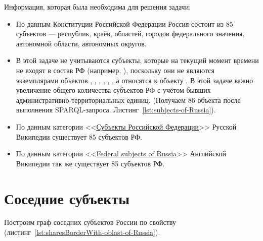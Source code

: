 Информация, которая была необходима для решения задачи:
\begin{itemize}
  \item По данным Конституции Российской Федерации Россия состоит из 85 субъектов — республик, краёв, областей, городов федерального значения, автономной области, автономных округов.
  \item В этой задаче не учитываются субъекты, которые на текущий момент времени не входят в состав РФ (например, ), поскольку они не являются экземплярами объектов , , , , , , а относятся к объекту . В этой задаче важно увеличение общего количества субъектов РФ с учётом бывших административно-территориальных единиц. (Получаем 86 объекта после выполнения SPARQL-запроса. Листинг~\protect\ref{lst:subjects-of-Russia}). 
  \item По данным категории <<\href{https://ru.wikipedia.org/wiki/Субъекты_Российской_Федерации}{Субъекты Российской Федерации}>> Русской Википедии существует 85 субъектов РФ.
  \item По данным категории <<\href{https://ru.wikipedia.org/wiki/en:Federal_subjects_of_Russia}{Federal subjects of Russia}>> Английской Википедии так же существует 85 субъектов РФ.
\end{itemize}


\section{Соседние субъекты}

Построим граф соседних субъектов России по свойству  (листинг~\protect\ref{lst:sharesBorderWith-oblast-of-Russia}).


